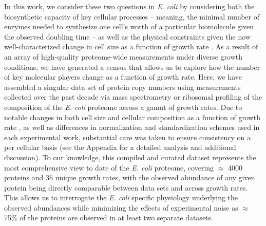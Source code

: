 In this work, we consider these two questions in \textit{E. coli} by considering
both the biosynthetic capacity of key cellular processes --  meaning, the minimal
number of enzymes needed to synthesize one cell's worth of a particular biomolecule 
given the observed doubling time --  as well as the physical constraints given the now
well-characterized change in cell size as a function of growth rate
\cite{taheriaraghi2015, si2017, basan2015}. As a result of an array of
high-quality proteome-wide measurements under diverse growth conditions, we have
generated a census that allows us to explore how the number of key molecular
players change as a function of growth rate. Here, we have assembled a singular
data set of protein copy numbers using measurements collected over the past
decade via mass spectrometry \citep{schmidt2016, peebo2015, valgepea2013} or
ribosomal profiling \citep{li2014} of the composition of the \textit{E. coli}
proteome across a gamut of growth rates. Due to notable changes in both cell
size and cellular composition as a function of growth rate \citep{bremer2008,
taheriaraghi2015}, as well as differences in normalization and standardization
schemes used in each experimental work, substantial care was taken to ensure
consistency on a per cellular basis (see the Appendix for a detailed analysis
and additional discussion). To our knowledge, this compiled and curated dataset
represents the most comprehensive view to date of the \textit{E. coli} proteome,
covering $\approx$ 4000 proteins and 36 unique growth rates, with the observed
abundance of any given protein being directly comparable between data sets and
across growth rates. This allows us to interrogate the \textit{E. coli} specific
physiology underlying the observed abundances while minimizing the effects of
experimental noise as $\approx$ 75\% of the  proteins are observed in at least
two separate datasets.


